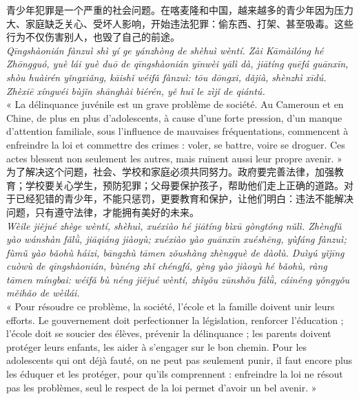 \documentclass[11pt]{article}
\begin{document}
\begin{textebox}
青少年犯罪是一个严重的社会问题。在喀麦隆和中国，越来越多的青少年因为压力大、家庭缺乏关心、受坏人影响，开始违法犯罪：偷东西、打架、甚至吸毒。这些行为不仅伤害别人，也毁了自己的前途。\\
\emph{Qīngshàonián fànzuì shì yí ge yánzhòng de shèhuì wèntí. Zài Kāmàilóng hé Zhōngguó, yuè lái yuè duō de qīngshàonián yīnwèi yālì dà, jiātíng quēfá guānxīn, shòu huàirén yǐngxiǎng, kāishǐ wéifǎ fànzuì: tōu dōngxi, dǎjià, shènzhì xīdú. Zhèxiē xíngwéi bùjǐn shānghài biérén, yě huǐ le zìjǐ de qiántú.}\\
« La délinquance juvénile est un grave problème de société. Au Cameroun et en Chine, de plus en plus d'adolescents, à cause d'une forte pression, d'un manque d'attention familiale, sous l'influence de mauvaises fréquentations, commencent à enfreindre la loi et commettre des crimes : voler, se battre, voire se droguer. Ces actes blessent non seulement les autres, mais ruinent aussi leur propre avenir. »\\[6pt]
为了解决这个问题，社会、学校和家庭必须共同努力。政府要完善法律，加强教育；学校要关心学生，预防犯罪；父母要保护孩子，帮助他们走上正确的道路。对于已经犯错的青少年，不能只惩罚，更要教育和保护，让他们明白：违法不能解决问题，只有遵守法律，才能拥有美好的未来。\\
\emph{Wèile jiějué zhège wèntí, shèhuì, xuéxiào hé jiātíng bìxū gòngtóng nǔlì. Zhèngfǔ yào wánshàn fǎlǜ, jiāqiáng jiàoyù; xuéxiào yào guānxīn xuéshēng, yùfáng fànzuì; fùmǔ yào bǎohù háizi, bāngzhù tāmen zǒushàng zhèngquè de dàolù. Duìyú yǐjīng cuòwù de qīngshàonián, bùnéng zhǐ chéngfá, gèng yào jiàoyù hé bǎohù, ràng tāmen míngbai: wéifǎ bù néng jiějué wèntí, zhǐyǒu zūnshǒu fǎlǜ, cáinéng yǒngyǒu měihǎo de wèilái.}\\
« Pour résoudre ce problème, la société, l'école et la famille doivent unir leurs efforts. Le gouvernement doit perfectionner la législation, renforcer l'éducation ; l'école doit se soucier des élèves, prévenir la délinquance ; les parents doivent protéger leurs enfants, les aider à s'engager sur le bon chemin. Pour les adolescents qui ont déjà fauté, on ne peut pas seulement punir, il faut encore plus les éduquer et les protéger, pour qu'ils comprennent : enfreindre la loi ne résout pas les problèmes, seul le respect de la loi permet d'avoir un bel avenir. »
\end{textebox}
\end{document}
